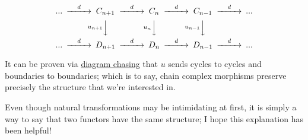 \documentclass[11pt]{article}
\begin{document}
\[\begin{CD}
... @>d>> C_{n+1} @>d>> C_n @>d>> C_{n-1} @>d>> ...\\
@.        @Vu_{n+1}VV   @Vu_nVV     @Vu_{n-1}VV\\
... @>d>> D_{n+1} @>d>> D_n @>d>> D_{n-1} @>d>> ...
\end{CD}\]

It can be proven via \href{https://en.wikipedia.org/wiki/Five\_lemma\#Proof}{diagram chasing} that \(u\) sends cycles to cycles and boundaries to boundaries; which is to say, chain complex morphisms preserve precisely the structure that we're interested in.

Even though natural transformations may be intimidating at first, it is simply a way to say that two functors have the same structure; I hope this explanation has been helpful!
\end{document}
